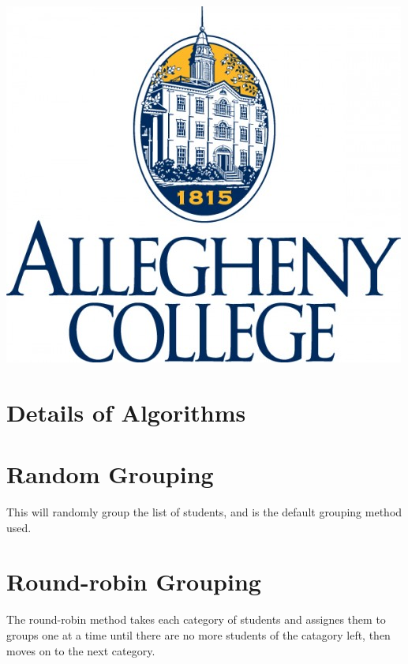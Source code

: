 \documentclass[a0paper,fleqn]{betterposter}
\begin{document}
{%
\vfill

\includegraphics[width=\textwidth]{img/aclogo.jpg}\\

}{

\section{\textbf{Details of Algorithms}}

\section{Random Grouping}
This will randomly group the list of students, and is the default grouping method
used.

\section{Round-robin Grouping}
The round-robin method takes each category of students and assignes them to
groups one at a time until there are no more students of the catagory left, then
moves on to the next category.

}
\end{document}
